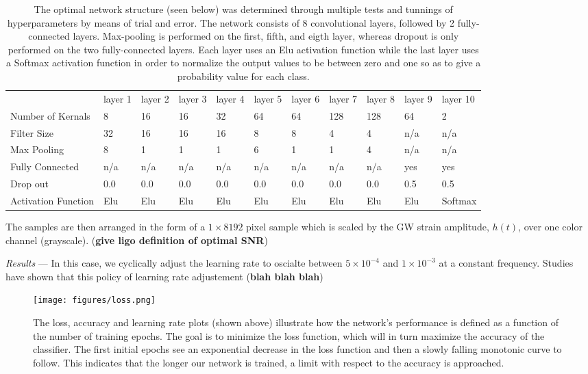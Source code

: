 \documentclass[%
 amsmath,amssymb,
 aps,
 twocolumn,
]{revtex4-1}
\begin{document}
\begin{table}[]
\centering
\caption{The optimal network structure (seen below) was determined through multiple tests and tunnings of hyperparameters by means of trial and error. The network consists of 8 convolutional layers, followed by 2 fully-connected layers. Max-pooling is performed on the first, fifth, and eigth layer, whereas dropout is only performed on the two fully-connected layers. Each layer uses an Elu activation function while the last layer uses a Softmax activation function in order to normalize the output values to be between zero and one so as to give a probability value for each class. \\} 
\label{my-label}
\begin{tabular}{lllllllllll}
                    & layer 1 & layer 2 & layer 3 & layer 4 & layer 5 & layer 6 & layer 7 & layer 8 & layer 9 & layer 10 \\
Number of Kernals   & 8       & 16      & 16      & 32      & 64      & 64      & 128     & 128     & 64      & 2        \\
Filter Size         & 32      & 16      & 16      & 16      & 8       & 8       & 4       & 4       & n/a     & n/a      \\
Max Pooling         & 8       & 1       & 1       & 1       & 6       & 1       & 1       & 4       & n/a     & n/a      \\
Fully Connected     & n/a     & n/a     & n/a     & n/a     & n/a     & n/a     & n/a     & n/a     & yes     & yes      \\
Drop out            & 0.0     & 0.0     & 0.0     & 0.0     & 0.0     & 0.0     & 0.0     & 0.0     & 0.5     & 0.5      \\
Activation Function & Elu     & Elu     & Elu     & Elu     & Elu     & Elu     & Elu     & Elu     & Elu     & Softmax 
\end{tabular}
\end{table}

The samples are then arranged in the form of a $1 \times 8192$ pixel sample which is scaled by the GW strain amplitude, $h(t)$, over one color channel (grayscale). (\textbf{give ligo definition of optimal SNR})

\textit{Results} --- In this case, we cyclically adjust the learning rate to oscialte between $5 \times 10^{-4}$ and $1 \times 10^{-3}$ at a constant frequency. Studies have shown that this policy of learning rate adjustement (\textbf{blah blah blah})

\begin{figure}[]
 \texttt{[image: figures/loss.png]}
 \caption{\label{fig:loss curve ex} The loss, accuracy and learning rate plots (shown above) illustrate how the network's performance is defined as a function of the number of training epochs. The goal is to minimize the loss function, which will in turn maximize the accuracy of the classifier. The first initial epochs see an exponential decrease in the loss function and then a slowly falling monotonic curve to follow. This indicates that the longer our network is trained, a limit with respect to the accuracy is approached.}
\end{figure}
\end{document}
